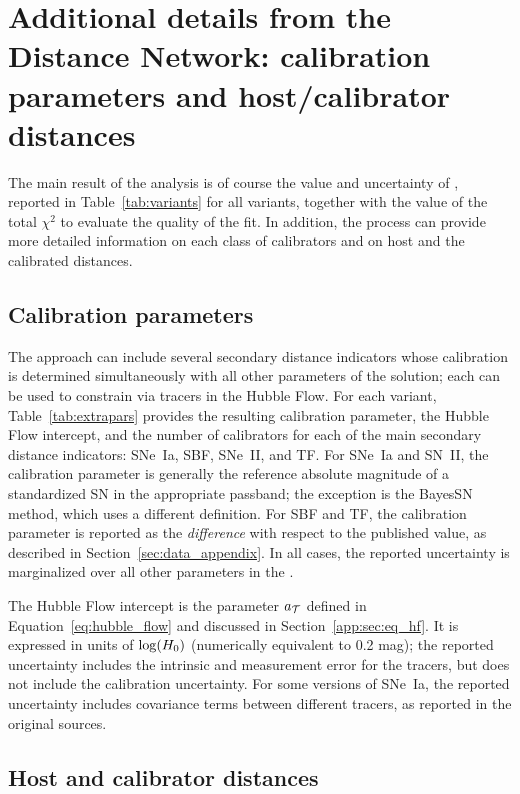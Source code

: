 \section{Additional details from the Distance Network: calibration parameters and host/calibrator distances}\label{app:sec:distance_table}

The main result of the {\DN} analysis is of course the value and uncertainty of {\Hcst}, reported in Table~\ref{tab:variants} for all variants, together with the value of the total $ \chi^2 $ to evaluate the quality of the fit.  In addition, the {\DN} process can provide more detailed information on each class of calibrators and on host and the calibrated distances.

\subsection{Calibration parameters}

The {\DN} approach can include several secondary distance indicators whose calibration is determined simultaneously with all other parameters of the solution; each can be used to constrain {\Hcst} via tracers in the Hubble Flow.  For each variant, Table~\ref{tab:extrapars} provides the resulting calibration parameter, the Hubble Flow intercept, and the number of calibrators for each of the main secondary distance indicators: SNe~Ia, SBF, SNe~II, and TF. For SNe~Ia and SN~II, the calibration parameter is generally the reference absolute magnitude of a standardized SN in the appropriate passband; the exception is the BayesSN method, which uses a different definition.  For SBF and TF, the calibration parameter is reported as the \textit{difference} with respect to the published value, as described in Section~\ref{sec:data_appendix}. In all cases, the reported uncertainty is marginalized over all other parameters in the {\DN}.

The Hubble Flow intercept is the parameter $ a_{\itype} $ defined in Equation~\ref{eq:hubble_flow} and discussed in Section~\ref{app:sec:eq_hf}.  It is expressed in units of $ \log(H_0) $ (numerically equivalent to 0.2 mag); the reported uncertainty includes the intrinsic and measurement error for the tracers, but does not include the calibration uncertainty.  For some versions of SNe~Ia, the reported uncertainty includes covariance terms between different tracers, as reported in the original sources.



\subsection{Host and calibrator distances}

